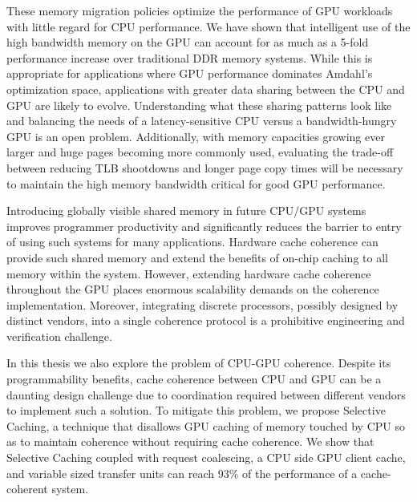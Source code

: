 These memory migration policies optimize the performance of GPU workloads with
little regard for CPU performance.  We have shown that intelligent use of the
high bandwidth memory on the GPU can account for as much as a 5-fold performance
increase over traditional DDR memory systems.  While this is appropriate for
applications where GPU performance dominates Amdahl's optimization space,
applications with greater data sharing between the CPU and GPU are likely to
evolve.  Understanding what these sharing patterns look like and
balancing the needs of a latency-sensitive CPU versus a bandwidth-hungry GPU is
an open problem. Additionally, with memory capacities growing ever larger and
huge pages becoming more commonly used, evaluating the trade-off between
reducing TLB shootdowns and longer page copy times will be necessary to maintain
the high memory bandwidth critical for good GPU performance.

Introducing globally visible shared memory in future CPU/GPU systems improves
programmer productivity and significantly reduces the barrier to entry of using
such systems for many applications.  Hardware cache coherence can provide such
shared memory and extend the benefits of on-chip caching to all memory within
the system.  However, extending hardware cache coherence throughout the GPU
places enormous scalability demands on the coherence implementation.  Moreover,
integrating discrete processors, possibly designed by distinct vendors, into a
single coherence protocol is a prohibitive engineering and verification
challenge.  

In this thesis we also explore the problem of CPU-GPU coherence. Despite its
programmability benefits, cache coherence between CPU and GPU can be a daunting
design challenge due to coordination required between different vendors to
implement such a solution. To mitigate this problem, we propose Selective
Caching, a technique that disallows GPU caching of memory touched by CPU so as
to maintain coherence without requiring cache coherence. We show that Selective
Caching coupled with request coalescing, a CPU side GPU client cache, and
variable sized transfer units can reach 93\% of the performance of a
cache-coherent system.
%
